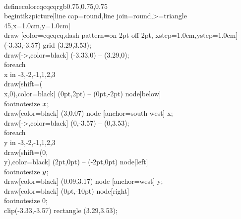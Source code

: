 \\definecolor{cqcqcq}{rgb}{0.75,0.75,0.75} \n\ 
\\begin{tikzpicture}[line cap=round,line join=round,>=triangle 45,x=1.0cm,y=1.0cm] \n\ 
\\draw [color=cqcqcq,dash pattern=on 2pt off 2pt, xstep=1.0cm,ystep=1.0cm] (-3.33,-3.57) grid (3.29,3.53); \n\ 
\\draw[->,color=black] (-3.33,0) -- (3.29,0); \n\ 
\\foreach \\x in {-3,-2,-1,1,2,3} \n\ 
\\draw[shift={(\\x,0)},color=black] (0pt,2pt) -- (0pt,-2pt) node[below] {\\footnotesize $\\x$}; \n\ 
\\draw[color=black] (3,0.07) node [anchor=south west] { x}; \n\ 
\\draw[->,color=black] (0,-3.57) -- (0,3.53); \n\ 
\\foreach \\y in {-3,-2,-1,1,2,3} \n\ 
\\draw[shift={(0,\\y)},color=black] (2pt,0pt) -- (-2pt,0pt) node[left] {\\footnotesize $\\y$}; \n\ 
\\draw[color=black] (0.09,3.17) node [anchor=west] { y}; \n\ 
\\draw[color=black] (0pt,-10pt) node[right] {\\footnotesize $0$}; \n\ 
\\clip(-3.33,-3.57) rectangle (3.29,3.53); \n\ 
